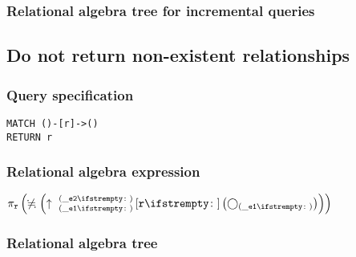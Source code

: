 \subsubsection*{Relational algebra tree for incremental queries}


\subsection{Do not return non-existent relationships}

\subsubsection*{Query specification}

\begin{lstlisting}
MATCH ()-[r]->()
RETURN r
\end{lstlisting}

\subsubsection*{Relational algebra expression}

$\projection{\var{r}} \left(\alldifferent{} \left(\expandout{\_e1}{\_e2}{}{r}{} \left(\getvertices{\_e1}{}\right)\right)\right)$

\subsubsection*{Relational algebra tree}


